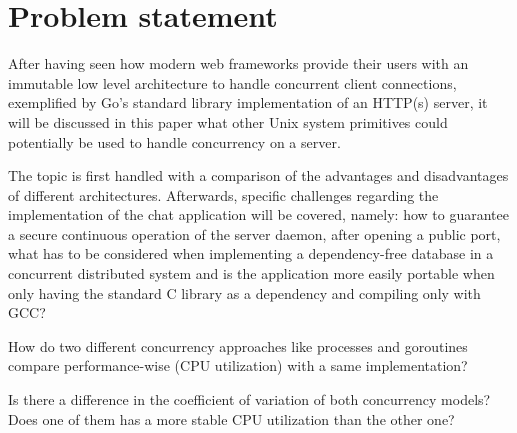 \section{Problem statement}
After having seen how modern web frameworks provide their users with an immutable low level architecture to handle concurrent client connections, exemplified by Go's standard library implementation of an HTTP(s) server, it will be discussed in this paper what other Unix system primitives could potentially be used to handle concurrency on a server.

The topic is first handled with a comparison of the advantages and disadvantages of different architectures. Afterwards, specific challenges regarding the implementation of the chat application will be covered, namely: how to guarantee a secure continuous operation of the server daemon, after opening a public port, what has to be considered when implementing a dependency-free database in a concurrent distributed system and is the application more easily portable when only having the standard C library as a dependency and compiling only with GCC?

How do two different concurrency approaches like processes and goroutines compare performance-wise (CPU utilization) with a same implementation?

Is there a difference in the coefficient of variation of both concurrency models? Does one of them has a more stable CPU utilization than the other one?

